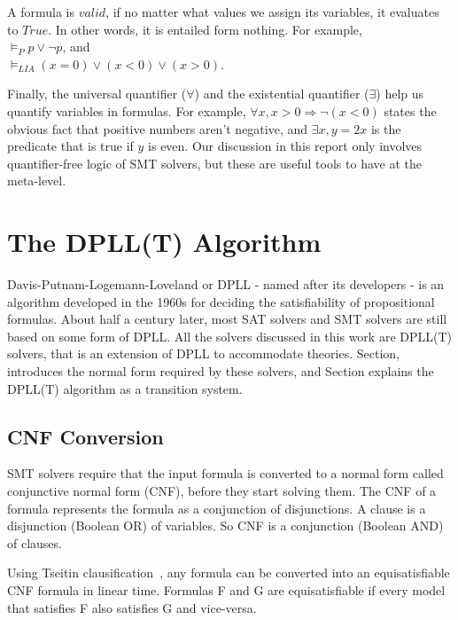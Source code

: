 \documentclass{report}
\begin{document}
A formula is $valid$, if no matter what values we assign its 
variables, it evaluates to $True$. In other words, it is
entailed form nothing. For example, \\
$\models_P p \lor \neg p$, and \\
$\models_{LIA} (x = 0) \lor (x < 0) \lor (x > 0)$.

Finally, the universal quantifier ($\forall$) and 
the existential quantifier ($\exists$) help us quantify 
variables in formulas. For example, $\forall x, x > 0 
\Rightarrow \neg (x < 0)$ states the obvious fact that 
positive numbers aren't negative, and $\exists x, y = 2x$ 
is the predicate that is true if $y$ is even. Our discussion 
in this report only involves quantifier-free logic of SMT 
solvers, but these are useful tools to have at the meta-level.


\section{The DPLL(T) Algorithm}
\label{sec:dpll}
Davis-Putnam-Logemann-Loveland or DPLL - named after its 
developers - is an algorithm developed in the 1960s 
for deciding the satisfiability of propositional formulas.
About half a century later, most SAT solvers and SMT solvers
are still based on some form of DPLL. All the solvers 
discussed in this work are DPLL(T) solvers, that is an 
extension of DPLL to accommodate theories. Section,
introduces the normal form required by these solvers, 
and Section explains the DPLL(T) algorithm as a 
transition system.

\subsection{CNF Conversion}
\label{sec:cnf}
SMT solvers require that the input formula is converted to a 
normal form called conjunctive normal form (CNF), before they 
start solving them. The CNF of a formula represents the 
formula as a conjunction of disjunctions. A clause is a 
disjunction (Boolean OR) of variables. So CNF is a 
conjunction (Boolean AND) of clauses. 

Using Tseitin clausification~\cite{BEL01Handbook}, any formula 
can be converted into an equisatisfiable CNF formula 
in linear time. Formulas F and G are equisatisfiable if 
every model that satisfies F also satisfies G and vice-versa.
\end{document}
